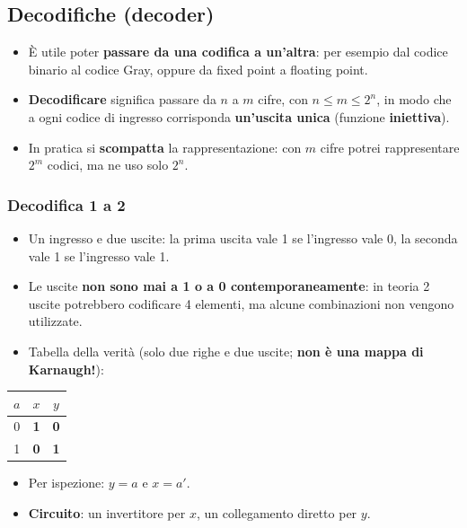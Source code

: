 \documentclass[12pt, a4paper]{article}
\begin{document}
\subsection{Decodifiche (decoder)}

\begin{itemize}
    \item È utile poter \textbf{passare da una codifica a un'altra}: per esempio dal codice binario al codice Gray, oppure da fixed point a floating point.
    \item \textcolor{blue!70!black}{\textbf{Decodificare}} significa passare da $n$ a $m$ cifre, con $n \le m \le 2^n$, in modo che a ogni codice di ingresso corrisponda \textbf{un'uscita unica} (funzione \textbf{iniettiva}).
    \item In pratica si \textbf{scompatta} la rappresentazione: con $m$ cifre potrei rappresentare $2^m$ codici, ma ne uso solo $2^n$.
\end{itemize}

\subsubsection{Decodifica 1 a 2}
\begin{itemize}
    \item Un ingresso e due uscite: la prima uscita vale 1 se l'ingresso vale 0, la seconda vale 1 se l'ingresso vale 1.
    \item Le uscite \textbf{non sono mai a 1 o a 0 contemporaneamente}: in teoria 2 uscite potrebbero codificare 4 elementi, ma alcune combinazioni non vengono utilizzate.
    \item Tabella della verità (solo due righe e due uscite; \textcolor{red!80!black}{\textbf{non è una mappa di Karnaugh!}}):
\end{itemize}

\begin{center}
\renewcommand{\arraystretch}{1.25}
\begin{tabular}[t]{|c||cc|}
\hline
\colorbox{gray!25}{\color{black}$a$} & \colorbox{gray!25}{\color{black}$x$} & \colorbox{gray!25}{\color{black}$y$} \\ \hline
0 & \textbf{1} & \textbf{0} \\ \hline
1 & \textbf{0} & \textbf{1} \\ \hline
\end{tabular}
\end{center}

\begin{itemize}
    \item Per ispezione: $y = a$ e $x = a'$.
    \item \textbf{Circuito}: un invertitore per $x$, un collegamento diretto per $y$.
\end{itemize}
\end{document}
